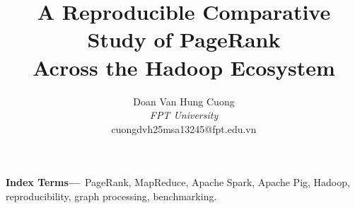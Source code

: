 \documentclass[twocolumn]{article}
\newenvironment{IEEEkeywords}{\par\medskip\noindent\textbf{Index Terms---}\,}{\par\medskip}
\begin{document}
\title{A Reproducible Comparative Study of PageRank\\ Across the Hadoop Ecosystem}
\author{Doan Van Hung Cuong\\ \textit{FPT University}\\ cuongdvh25msa13245@fpt.edu.vn}
\date{}
\maketitle

\begin{abstract}

\end{abstract}

\begin{IEEEkeywords}
PageRank, MapReduce, Apache Spark, Apache Pig, Hadoop, reproducibility,
graph processing, benchmarking.
\end{IEEEkeywords}


\end{document}
